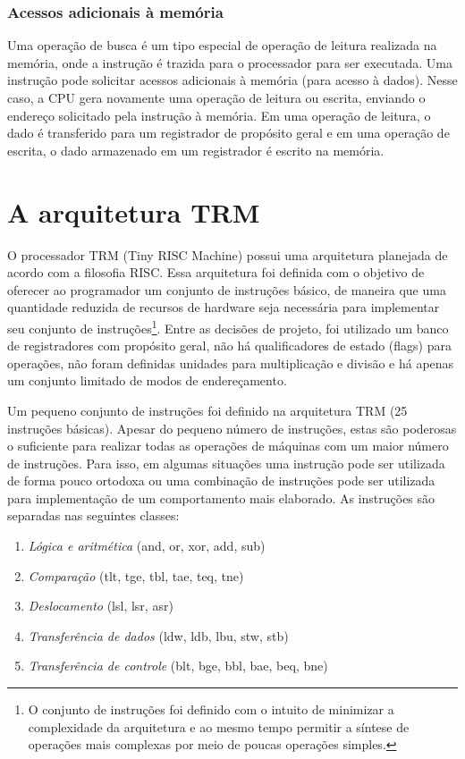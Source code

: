 \documentclass[11pt,a4paper]{report}
\begin{document}
\subsection{Acessos adicionais à memória}

Uma operação de busca é um tipo especial de operação de leitura realizada
na memória, onde a instrução é trazida para o processador para ser
executada. Uma instrução pode solicitar acessos adicionais à memória
(para acesso à dados). Nesse caso, a CPU gera novamente uma operação
de leitura ou escrita, enviando o endereço solicitado pela instrução
à memória. Em uma operação de leitura, o dado é transferido para um
registrador de propósito geral e em uma operação de escrita, o dado
armazenado em um registrador é escrito na memória.


\chapter{A arquitetura TRM}

O processador TRM (Tiny RISC Machine) possui uma arquitetura planejada
de acordo com a filosofia RISC. Essa arquitetura foi definida com o
objetivo de oferecer ao programador um conjunto de instruções básico, de
maneira que uma quantidade reduzida de recursos de hardware seja
necessária para implementar seu conjunto de instruções\footnote{O conjunto
de instruções foi definido com o intuito de minimizar a complexidade da
arquitetura e ao mesmo tempo permitir a síntese de operações mais
complexas por meio de poucas operações simples.}. Entre as decisões de
projeto, foi utilizado um banco de registradores com propósito geral,
não há qualificadores de estado (flags) para operações, não foram
definidas unidades para multiplicação e divisão e há apenas um conjunto
limitado de modos de endereçamento.

Um pequeno conjunto de instruções foi definido na arquitetura TRM (25
instruções básicas). Apesar do pequeno número de instruções, estas são 
poderosas o suficiente para realizar todas as operações de máquinas com
um maior número de instruções. Para isso, em algumas situações uma
instrução pode ser utilizada de forma pouco ortodoxa ou uma combinação
de instruções pode ser utilizada para implementação de um comportamento
mais elaborado. As instruções são separadas nas seguintes classes:

\begin{enumerate}
\item \textit{Lógica e aritmética} (and, or, xor, add, sub)
\item \textit{Comparação} (tlt, tge, tbl, tae, teq, tne)
\item \textit{Deslocamento} (lsl, lsr, asr)
\item \textit{Transferência de dados} (ldw, ldb, lbu, stw, stb)
\item \textit{Transferência de controle} (blt, bge, bbl, bae, beq, bne)
\end{enumerate}
\end{document}
